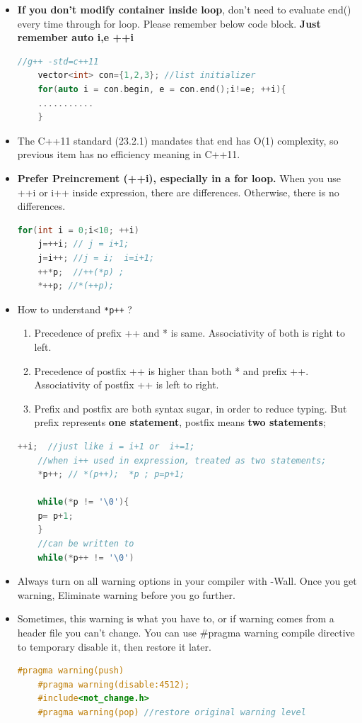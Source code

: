 \documentclass[a4paper,12pt,twoside]{book}
\begin{document}
\begin{itemize}
	\item \textbf{If you don't modify container inside loop}, don't need to evaluate end() every time through for loop. Please remember below code block. \textbf{Just remember auto i,e ++i}
	\begin{lstlisting}[frame=single, language=c++]
	//g++ -std=c++11
	vector<int> con={1,2,3}; //list initializer
	for(auto i = con.begin, e = con.end();i!=e; ++i){
	...........
	}
	\end{lstlisting}
	
	\item The C++11 standard (23.2.1) mandates that end has O(1) complexity, so previous item has no efficiency meaning in C++11.
	
	
	\item \textbf{Prefer Preincrement (++i), especially in a for loop.}  When you use ++i or i++ inside expression, there are differences. Otherwise, there is no differences.
	\begin{lstlisting}[frame=single, language=c++]
	for(int i = 0;i<10; ++i)
	j=++i; // j = i+1;
	j=i++; //j = i;  i=i+1;
	++*p;  //++(*p) ;
	*++p; //*(++p);
	\end{lstlisting}
	
	\item How to understand \texttt{*p++} ?
	
	\begin{enumerate}
		\item Precedence of prefix ++ and * is same. Associativity of both is right to left.
		\item Precedence of postfix ++ is higher than both * and prefix ++. Associativity of postfix ++ is left to right.
		\item Prefix and postfix are both syntax sugar, in order to reduce typing.   But prefix represents \textbf{one statement}, postfix means \textbf{two statements};
	\end{enumerate}
	
	\begin{lstlisting}[frame=single, language=c++]
	++i;  //just like i = i+1 or  i+=1;
	//when i++ used in expression, treated as two statements;
	*p++; // *(p++);  *p ; p=p+1;
	
	while(*p != '\0'){
	p= p+1;
	}
	//can be written to
	while(*p++ != '\0')
	\end{lstlisting}
	
	\item Always turn on all warning options in your compiler with -Wall. Once you get warning, Eliminate warning before you go further.
	
	\item Sometimes, this warning is what you have to, or if warning comes from a header file you can't change. You can use \#pragma warning compile directive to temporary disable it, then restore it later.
	\begin{lstlisting}[frame=single, language=c++]
	#pragma warning(push)
	#pragma warning(disable:4512);
	#include<not_change.h>
	#pragma warning(pop) //restore original warning level
	\end{lstlisting}
	
\end{itemize}
\end{document}
